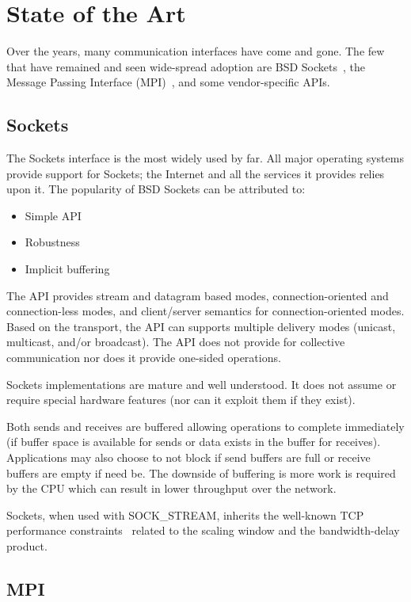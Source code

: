 \section{State of the Art}
\label{sec:state}
Over the years, many communication interfaces have come and gone. The few that have
remained and seen wide-spread adoption are BSD Sockets~\cite{Sechrest:CSD-84-191}, the Message Passing
Interface (MPI)~\cite{mpi_forum93:_mpi}, and some vendor-specific APIs.

\subsection{Sockets} The Sockets interface is the most widely used by far. All major
operating systems provide support for Sockets; the Internet and all the services it
provides relies upon it. The popularity of BSD Sockets can be attributed to:

\begin{itemize}
\item Simple API
\item Robustness
\item Implicit buffering
\end{itemize}

The API provides stream and datagram based modes, connection-oriented and connection-less
modes, and client/server semantics for connection-oriented modes. Based on the transport,
the API can supports multiple delivery modes (unicast, multicast, and/or broadcast). The
API does not provide for collective communication nor does it provide one-sided
operations.

Sockets implementations are mature and well understood. It does not assume or require
special hardware features (nor can it exploit them if they exist).

Both sends and receives are buffered allowing operations to complete immediately (if buffer
space is available for sends or data exists in the buffer for receives). Applications may
also choose to not block if send buffers are full or receive buffers are empty if need be.
The downside of buffering is more work is required by the CPU which can result in lower
throughput over the network.

Sockets, when used with SOCK\_STREAM, inherits the well-known TCP
performance constraints~\cite{Foong03tcpperformance} related to the
scaling window and the bandwidth-delay product. 

\subsection{MPI}
\label{sec:mpi} 


